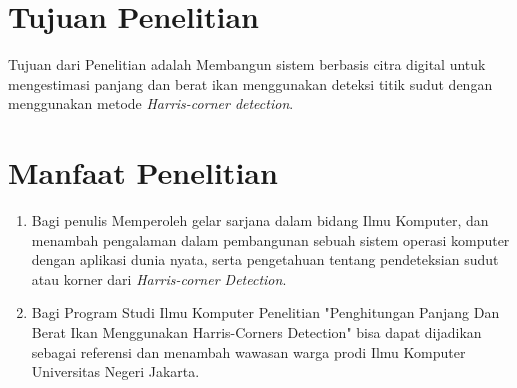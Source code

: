 \section{Tujuan Penelitian}
	Tujuan dari Penelitian adalah Membangun sistem berbasis citra digital untuk mengestimasi panjang dan berat ikan menggunakan deteksi titik sudut dengan menggunakan metode \emph{Harris-corner detection}. 

\section{Manfaat Penelitian}
\begin{enumerate}
	\item Bagi penulis
	 Memperoleh gelar sarjana dalam bidang Ilmu Komputer, dan menambah pengalaman dalam pembangunan sebuah sistem operasi komputer dengan aplikasi dunia nyata, serta pengetahuan tentang pendeteksian sudut atau korner dari \emph{Harris-corner Detection}. 

		
	\item Bagi Program Studi Ilmu Komputer
	Penelitian "Penghitungan Panjang Dan Berat Ikan Menggunakan Harris-Corners Detection" bisa dapat dijadikan sebagai referensi dan menambah wawasan warga prodi Ilmu Komputer Universitas Negeri Jakarta.
		
\end{enumerate}

\begin{comment}

\end{comment}
